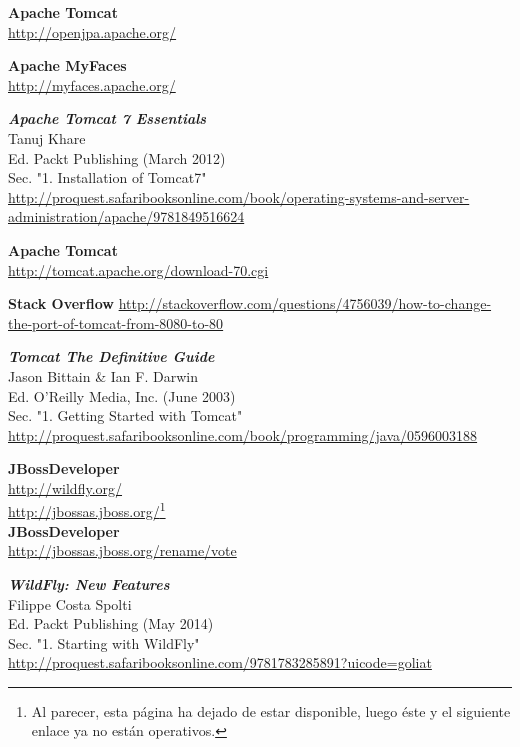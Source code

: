 \documentclass[a4paper, 10pt]{article}
\begin{document}
\begin{thebibliography}{10}
	\textbf{Apache Tomcat}\\
		\url{http://openjpa.apache.org/}

	\textbf{Apache MyFaces}\\
		\url{http://myfaces.apache.org/}

	\textbf{\textit{Apache Tomcat 7 Essentials}}\\
	Tanuj Khare\\
	Ed. Packt Publishing (March 2012)\\
	Sec. "1. Installation of Tomcat7"\\
		\url{http://proquest.safaribooksonline.com/book/operating-systems-and-server-administration/apache/9781849516624}
	
	\textbf{Apache Tomcat}\\
		\url{http://tomcat.apache.org/download-70.cgi}

	\textbf{Stack Overflow}
		\url{http://stackoverflow.com/questions/4756039/how-to-change-the-port-of-tomcat-from-8080-to-80}

	\textbf{\textit{Tomcat The Definitive Guide}}\\
	Jason Bittain \& Ian F. Darwin\\
	Ed. O'Reilly Media, Inc. (June 2003)\\
	Sec. "1. Getting Started with Tomcat"\\
		\url{http://proquest.safaribooksonline.com/book/programming/java/0596003188}
	
	\textbf{JBossDeveloper}\\
		\url{http://wildfly.org/}\\
		\url{http://jbossas.jboss.org/}\footnote{Al parecer, esta página ha dejado de estar disponible,
		luego éste y el siguiente enlace ya no están operativos.}\\
		
	
	\textbf{JBossDeveloper}\\
		\url{http://jbossas.jboss.org/rename/vote}
	
	\textbf{\textit{WildFly: New Features}}\\
	Filippe Costa Spolti\\
	Ed. Packt Publishing (May 2014)\\
	Sec. "1. Starting with WildFly"\\
		\url{http://proquest.safaribooksonline.com/9781783285891?uicode=goliat} 


\end{thebibliography}
\end{document}
